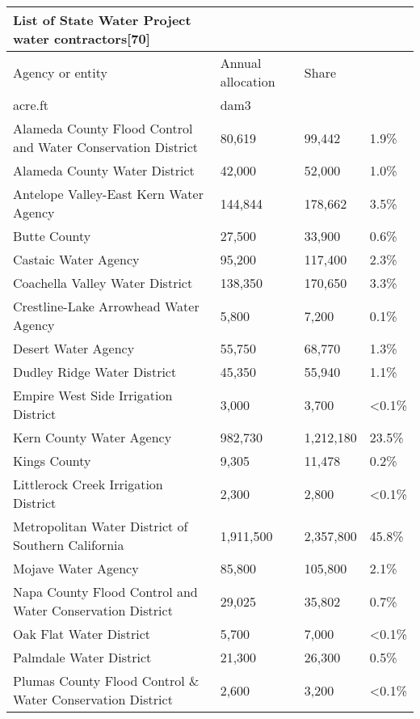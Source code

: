 \documentclass{article}
\begin{document}
\begin{table}[!ht]
    \centering
    \begin{tabular}{|l|l|l|l|}
    \hline
        List of State Water Project water contractors[70]  & ~ & ~ & ~ \\ \hline
        Agency or entity & Annual allocation & Share  & ~ \\ \hline
        acre.ft & dam3 &   & ~ \\ \hline
        Alameda County Flood Control and Water Conservation District & 80,619 & 99,442 & 1.9\%  \\ \hline
        Alameda County Water District & 42,000 & 52,000 & 1.0\%  \\ \hline
        Antelope Valley-East Kern Water Agency & 144,844 & 178,662 & 3.5\%  \\ \hline
        Butte County & 27,500 & 33,900 & 0.6\%  \\ \hline
        Castaic Water Agency & 95,200 & 117,400 & 2.3\%  \\ \hline
        Coachella Valley Water District & 138,350 & 170,650 & 3.3\%  \\ \hline
        Crestline-Lake Arrowhead Water Agency & 5,800 & 7,200 & 0.1\%  \\ \hline
        Desert Water Agency & 55,750 & 68,770 & 1.3\%  \\ \hline
        Dudley Ridge Water District & 45,350 & 55,940 & 1.1\%  \\ \hline
        Empire West Side Irrigation District & 3,000 & 3,700 & <0.1\%  \\ \hline
        Kern County Water Agency & 982,730 & 1,212,180 & 23.5\%  \\ \hline
        Kings County & 9,305 & 11,478 & 0.2\%  \\ \hline
        Littlerock Creek Irrigation District & 2,300 & 2,800 & <0.1\%  \\ \hline
        Metropolitan Water District of Southern California & 1,911,500 & 2,357,800 & 45.8\% \\ \hline
        Mojave Water Agency & 85,800 & 105,800 & 2.1\%  \\ \hline
        Napa County Flood Control and Water Conservation District & 29,025 & 35,802 & 0.7\%  \\ \hline
        Oak Flat Water District & 5,700 & 7,000 & <0.1\%  \\ \hline
        Palmdale Water District & 21,300 & 26,300 & 0.5\%  \\ \hline
        Plumas County Flood Control \& Water Conservation District & 2,600 & 3,200 & <0.1\%  \\ \hline

\end{tabular}
\end{table}
\end{document}
